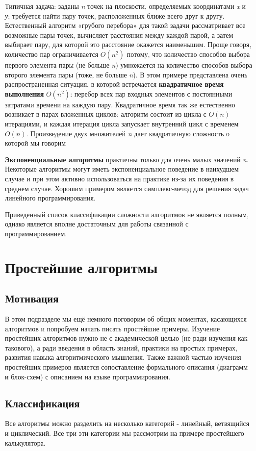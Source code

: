 \documentclass[fontsize=14bp]{report}
\begin{document}
Типичная задача: заданы \textit{n} точек на плоскости, определяемых координатами \textit{x} и \textit{у}; требуется найти пару точек, расположенных ближе всего друг к другу. Естественный алгоритм «грубого перебора» для такой задачи рассматривает все возможные пары точек, вычисляет расстояния между каждой парой, а затем выбирает пару, для которой это расстояние окажется наименьшим. Проще говоря, количество пар ограничивается $O(n^2)$ потому, что количество способов выбора первого элемента пары (не больше \textit{n}) умножается на количество способов выбора второго элемента пары (тоже, не больше \textit{n}). В этом примере представлена очень распространенная ситуация, в которой встречается \textbf{квадратичное время выполнения} $O(n^2)$: перебор всех пар входных элементов с постоянными затратами времени на каждую пару. Квадратичное время так же естественно возникает в парах вложенных циклов: алгоритм состоит из цикла с $O(n)$ итерациями, и каждая итерация цикла запускает внутренний цикл с временем $O(n)$. Произведение двух множителей \textit{n} дает квадратичную сложность о которой мы говорим

\textbf{Экспоненциальные алгоритмы} практичны только для очень малых значений \textit{n}. Некоторые алгоритмы могут иметь экспоненциальное поведение в наихудшем случае и при этом активно использоваться на практике из-за их поведения в среднем случае. Хорошим примером является симплекс-метод для решения задач линейного программирования.

Приведенный список классификации сложности алгоритмов не является полным, однако является вполне достаточным для работы связанной с программированием.
\section{Простейшие алгоритмы}
\subsection{Мотивация}
В этом подразделе мы ещё немного поговорим об общих моментах, касающихся алгоритмов и попробуем начать писать простейшие примеры. Изучение простейших алгоритмов нужно не с академической целью (не ради изучения как такового), а ради введения в область знаний, практики на простых примерах, развития навыка алгоритмического мышления. Также важной частью изучения простейших примеров является сопоставление формального описания (диаграмм и блок-схем) с описанием на языке программирования.
\subsection{Классификация}
Все алгоритмы можно разделить на несколько категорий - линейный, ветвящийся и циклический. Все три эти категории мы рассмотрим на примере простейшего калькулятора. 
\end{document}
